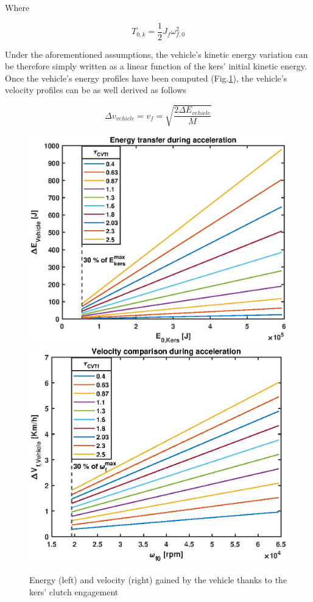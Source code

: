 \documentclass[11pt]{article}
\begin{document}
Where

\begin{equation}
T_{0,k} = \frac{1}{2}J_f\omega_{f,0}^2
\end{equation}

Under the aforementioned assumptions, the vehicle's kinetic energy variation can be therefore simply written as a linear function of the kers' initial kinetic energy. Once the vehicle's energy profiles have been computed (Fig.\ref{en_comp_acc}), the vehicle's velocity profiles can be as well derived as follows

\begin{equation}
\Delta v_{vehicle} = v_f = \sqrt{\frac{2\Delta E_{vehicle}}{M}}
\end{equation}

\begin{figure}[H]
\captionsetup{font=small, justification=centering}
\centering
\includegraphics[width=.49\textwidth]{Images/Results_new/Univariate_SteadyState/en_comp_acc.eps}\hfill
\includegraphics[width=.49\textwidth]{Images/Results_new/Univariate_SteadyState/vel_comp_acc.eps}
\caption{Energy (left) and velocity (right) gained by the vehicle thanks to the kers' clutch engagement}
\label{en_comp_acc}
\end{figure}
\end{document}
